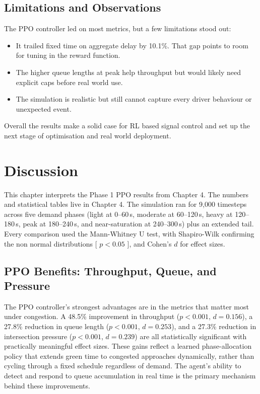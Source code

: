 ﻿\documentclass[11pt, a4paper]{report}
\begin{document}
\section{Limitations and Observations}

The PPO controller led on most metrics, but a few limitations stood out:

\begin{itemize}
    \item It trailed fixed time on aggregate delay by 10.1\%. That gap points to room for tuning in the reward function.
    \item The higher queue lengths at peak help throughput but would likely need explicit caps before real world use.
    \item The simulation is realistic but still cannot capture every driver behaviour or unexpected event.
\end{itemize}

Overall the results make a solid case for RL based signal control and set up the next stage of optimisation and real world deployment.

\chapter{Discussion}

This chapter interprets the Phase 1 PPO results from Chapter 4. The numbers and statistical tables live in Chapter 4. The simulation ran for 9,000 timesteps across five demand phases (light at 0--60\,s, moderate at 60--120\,s, heavy at 120--180\,s, peak at 180--240\,s, and near-saturation at 240--300\,s) plus an extended tail. Every comparison used the Mann-Whitney U test, with Shapiro-Wilk confirming the non normal distributions [ $p < 0.05$ ], and Cohen's $d$ for effect sizes.

\section{PPO Benefits: Throughput, Queue, and Pressure}

The PPO controller's strongest advantages are in the metrics that matter most under congestion. A 48.5\% improvement in throughput ($p < 0.001$, $d = 0.156$), a 27.8\% reduction in queue length ($p < 0.001$, $d = 0.253$), and a 27.3\% reduction in intersection pressure ($p < 0.001$, $d = 0.239$) are all statistically significant with practically meaningful effect sizes. These gains reflect a learned phase-allocation policy that extends green time to congested approaches dynamically, rather than cycling through a fixed schedule regardless of demand. The agent's ability to detect and respond to queue accumulation in real time is the primary mechanism behind these improvements.
\end{document}
